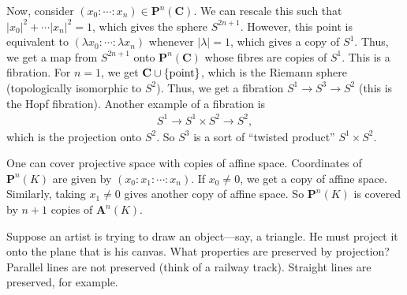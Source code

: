 \documentclass [11 pt, oneside, margin = 1 in] {article}
\begin{document}
Now, consider $(x_0:\cdots : x_n)\in \mathbf{P}^n(\mathbf{C})$. We can rescale this such that $\left\lvert x_0 \right\rvert ^2 + \cdots \left\lvert x_n \right\rvert ^2 = 1$, which gives the sphere $S^{2n+1}$. However, this point is equivalent to $(\lambda x_0:\cdots:\lambda x_n)$ whenever $\left\lvert \lambda \right\rvert =1$, which gives a copy of $S^1$. Thus, we get a map from $S^{2n+1}$ onto $\mathbf{P}^n(\mathbf{C})$ whose fibres are copies of $S^1$. This is a fibration. For $n=1$, we get $\mathbf C \cup \{ \textrm{point}\}$, which is the Riemann sphere (topologically isomorphic to $S^2$). Thus, we get a fibration $S^1 \longrightarrow S^3 \longrightarrow S^2$ (this is the Hopf fibration). Another example of a fibration is 
\begin{align*}
	S^1 \longrightarrow S^1\times S^2 \longrightarrow S^2,
\end{align*}
which is the projection onto $S^2$. So $S^3$ is a sort of ``twisted product'' $S^1\times S^2$.


One can cover projective space with copies of affine space. Coordinates of $\mathbf{P}^n(K)$ are given by $(x_0:x_1:\cdots : x_n)$. If $x_0\ne 0$, we get a copy of affine space. Similarly, taking $x_1\ne 0$ gives another copy of affine space. So $\mathbf{P}^n(K)$ is covered by $n+1$ copies of $\mathbf{A}^n(K)$.

Suppose an artist is trying to draw an object---say, a triangle. He must project it onto the plane that is his canvas. What properties are preserved by projection? Parallel lines are not preserved (think of a railway track). Straight lines are preserved, for example.
\end{document}
